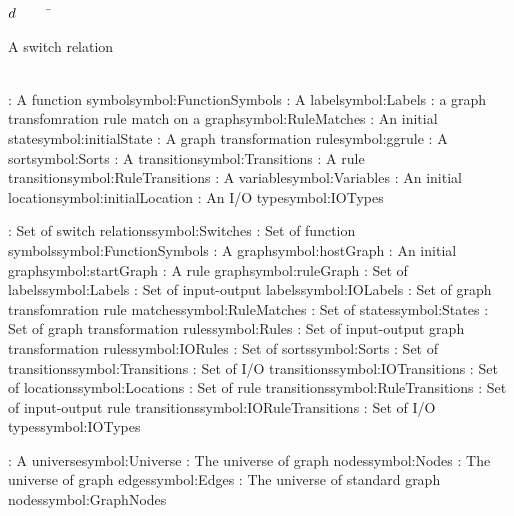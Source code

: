 \begin{tabbing}

$d$~~~~~\=\parbox{5in}{A switch relation\dotfill \pageref{symbol:Switches}}\\
\addsymbol \functionSymbol: {A function symbol}{symbol:FunctionSymbols}
\addsymbol \ltsLabel: {A label}{symbol:Labels}
\addsymbol {}: {a graph transfomration rule match on a graph}{symbol:RuleMatches}
\addsymbol \initialState: {An initial state}{symbol:initialState}
\addsymbol \ggrule: {A graph transformation rule}{symbol:ggrule}
\addsymbol \sort: {A sort}{symbol:Sorts}
\addsymbol \transition: {A transition}{symbol:Transitions}
\addsymbol {}: {A rule transition}{symbol:RuleTransitions}
\addsymbol \variable: {A variable}{symbol:Variables}
\addsymbol \initialLocation: {An initial location}{symbol:initialLocation}
\addsymbol \iotype: {An I/O type}{symbol:IOTypes}

\addsymbol \Switches: {Set of switch relations}{symbol:Switches}
\addsymbol \FunctionSymbols: {Set of function symbols}{symbol:FunctionSymbols}
\addsymbol \hostGraph: {A graph}{symbol:hostGraph}
\addsymbol \startGraph: {An initial graph}{symbol:startGraph}
\addsymbol {}: {A rule graph}{symbol:ruleGraph}
\addsymbol \Labels: {Set of labels}{symbol:Labels}
\addsymbol \Labels: {Set of input-output labels}{symbol:IOLabels}
\addsymbol \RuleMatches: {Set of graph transfomration rule matches}{symbol:RuleMatches}
\addsymbol \States: {Set of states}{symbol:States}
\addsymbol \Rules: {Set of graph transformation rules}{symbol:Rules}
\addsymbol \IORules: {Set of input-output graph transformation rules}{symbol:IORules}
\addsymbol \Sorts: {Set of sorts}{symbol:Sorts}
\addsymbol \Transitions: {Set of transitions}{symbol:Transitions}
\addsymbol \IOTransitions: {Set of I/O transitions}{symbol:IOTransitions}
\addsymbol \Locations: {Set of locations}{symbol:Locations}
\addsymbol \RuleTransitions: {Set of rule transitions}{symbol:RuleTransitions}
\addsymbol \IORuleTransitions: {Set of input-output rule transitions}{symbol:IORuleTransitions}
\addsymbol \IOTypes: {Set of I/O types}{symbol:IOTypes}

\addsymbol {}: {A universe}{symbol:Universe}
\addsymbol \Nodes: {The universe of graph nodes}{symbol:Nodes}
\addsymbol \Edges: {The universe of graph edges}{symbol:Edges}
\addsymbol \GraphNodes: {The universe of standard graph nodes}{symbol:GraphNodes}


\end{tabbing}
